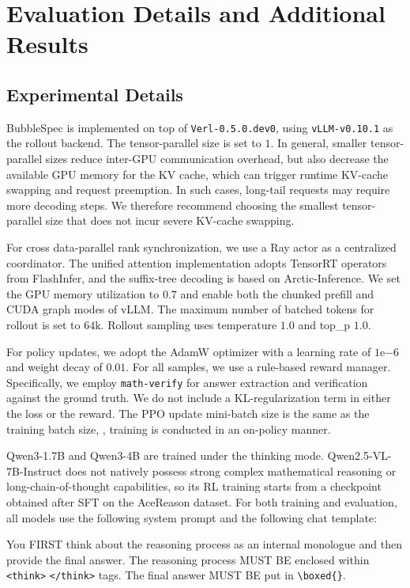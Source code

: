 \newpage
\appendix
\onecolumn 

\section{Evaluation Details and Additional Results} 

\subsection{Experimental Details} 
BubbleSpec is implemented on top of \texttt{Verl-0.5.0.dev0}, using \texttt{vLLM-v0.10.1} as the rollout backend. The tensor-parallel size is set to $1$. In general, smaller tensor-parallel sizes reduce inter-GPU communication overhead, but also decrease the available GPU memory for the KV cache, which can trigger runtime KV-cache swapping and request preemption. In such cases, long-tail requests may require more decoding steps. We therefore recommend choosing the smallest tensor-parallel size that does not incur severe KV-cache swapping.

For cross data-parallel rank synchronization, we use a Ray actor as a centralized coordinator. The unified attention implementation adopts TensorRT operators from FlashInfer, and the suffix-tree decoding is based on Arctic-Inference. We set the GPU memory utilization to $0.7$ and enable both the chunked prefill and CUDA graph modes of vLLM. The maximum number of batched tokens for rollout is set to $64\mathrm{k}$. Rollout sampling uses temperature $1.0$ and top\_p $1.0$.

For policy updates, we adopt the AdamW optimizer with a learning rate of $1\mathrm{e}{-6}$ and weight decay of $0.01$. For all samples, we use a rule-based reward manager. Specifically, we employ \texttt{math-verify} for answer extraction and verification against the ground truth. We do not include a KL-regularization term in either the loss or the reward. The PPO update mini-batch size is the same as the training batch size, \ie, training is conducted in an on-policy manner.

Qwen3-1.7B and Qwen3-4B are trained under the thinking mode. Qwen2.5-VL-7B-Instruct does not natively possess strong complex mathematical reasoning or long-chain-of-thought capabilities, so its RL training starts from a checkpoint obtained after SFT on the AceReason dataset. For both training and evaluation, all models use the following system prompt and the following chat template:

\begin{tcolorbox}[
    colback=Teal!10!white, 
    colframe=Teal,
    coltitle=Base,
    title = {System Prompt}
]
You FIRST think about the reasoning process as an internal monologue and then provide the final answer. The reasoning process MUST BE enclosed within \texttt{<think>} \texttt{</think>} tags. The final answer MUST BE put in \verb|\boxed{}|. 
\end{tcolorbox}

